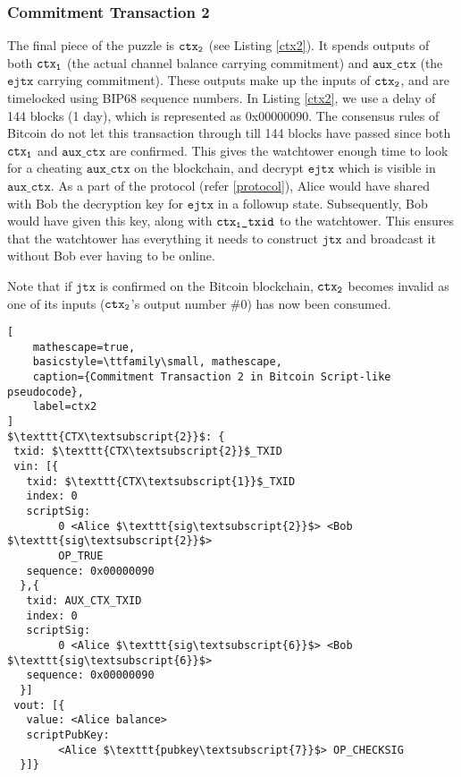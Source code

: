 \subsubsection{Commitment Transaction 2}
The final piece of the puzzle is $\texttt{ctx\textsubscript{2}}$ (see Listing \ref{ctx2}). It spends outputs of both $\texttt{ctx\textsubscript{1}}$ (the actual channel balance carrying commitment) and $\texttt{aux\_ctx}$ (the $\texttt{ejtx}$ carrying commitment). These outputs make up the inputs of $\texttt{ctx\textsubscript{2}}$, and are timelocked using BIP68 \cite{BIP68} sequence numbers. In Listing \ref{ctx2}, we use a delay of 144 blocks (1 day), which is represented as 0x00000090. The consensus rules of Bitcoin do not let this transaction through till 144 blocks have passed since both $\texttt{ctx\textsubscript{1}}$ and $\texttt{aux\_ctx}$ are confirmed. This gives the watchtower enough time to look for a cheating $\texttt{aux\_ctx}$ on the blockchain, and decrypt $\texttt{ejtx}$ which is visible in $\texttt{aux\_ctx}$. As a part of the protocol (refer \ref{protocol}), Alice would have shared with Bob the decryption key for $\texttt{ejtx}$ in a followup state. Subsequently, Bob would have given this key, along with $\texttt{ctx\textsubscript{1}\_txid}$ to the watchtower. This ensures that the watchtower has everything it needs to construct $\texttt{jtx}$ and broadcast it without Bob ever having to be online. 

Note that if $\texttt{jtx}$ is confirmed on the Bitcoin blockchain, $\texttt{ctx\textsubscript{2}}$ becomes invalid as one of its inputs ($\texttt{ctx\textsubscript{2}}$'s output number \#0) has now been consumed. 

\begin{lstlisting}[
    mathescape=true,
    basicstyle=\ttfamily\small, mathescape,
    caption={Commitment Transaction 2 in Bitcoin Script-like pseudocode},
    label=ctx2
]
$\texttt{CTX\textsubscript{2}}$: {
 txid: $\texttt{CTX\textsubscript{2}}$_TXID
 vin: [{
   txid: $\texttt{CTX\textsubscript{1}}$_TXID
   index: 0
   scriptSig: 
        0 <Alice $\texttt{sig\textsubscript{2}}$> <Bob $\texttt{sig\textsubscript{2}}$>
        OP_TRUE
   sequence: 0x00000090
  },{
   txid: AUX_CTX_TXID
   index: 0
   scriptSig: 
        0 <Alice $\texttt{sig\textsubscript{6}}$> <Bob $\texttt{sig\textsubscript{6}}$>
   sequence: 0x00000090
  }]
 vout: [{
   value: <Alice balance>
   scriptPubKey: 
        <Alice $\texttt{pubkey\textsubscript{7}}$> OP_CHECKSIG
  }]}
\end{lstlisting}


